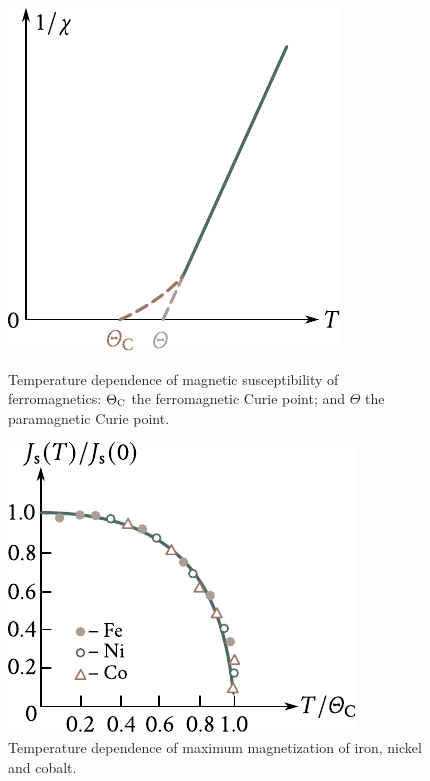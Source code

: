 \begin{figure}[!t]
	\begin{minipage}[t]{0.48\linewidth}
		\begin{center}
			\includegraphics[scale=1]{figures/ch_07/fig_7_4.pdf}
			\caption[]{Temperature dependence of magnetic susceptibility of ferromagnetics: $\Theta_{\text{C}}$ the ferromagnetic Curie point; and $\Theta$ the paramagnetic Curie point.}
			\label{fig:7_4}
		\end{center}
	\end{minipage}
	\hfill{ }%
	\begin{minipage}[t]{0.48\linewidth}
		\begin{center}
			\includegraphics[scale=1]{figures/ch_07/fig_7_5.pdf}
			\caption[]{Temperature dependence of maximum magnetization of iron, nickel and cobalt.}
			\label{fig:7_5}
		\end{center}
	\end{minipage}
\vspace{-0.3cm}
\end{figure}

